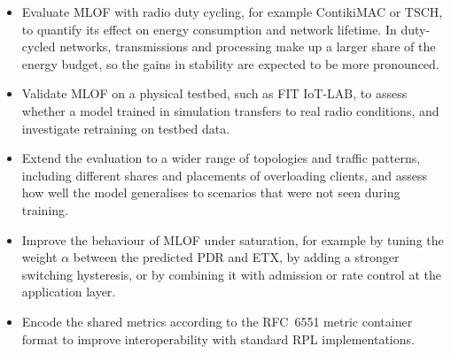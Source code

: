 \begin{itemize}
    \item Evaluate MLOF with radio duty cycling, for example
        ContikiMAC or TSCH, to quantify its effect on energy
        consumption and network lifetime. In duty-cycled networks,
        transmissions and processing make up a larger share of the
        energy budget, so the gains in stability are expected to be
        more pronounced.
    \item Validate MLOF on a physical testbed, such as FIT IoT-LAB, to
        assess whether a model trained in simulation transfers to
        real radio conditions, and investigate retraining on
        testbed data.
    \item Extend the evaluation to a wider range of topologies and
        traffic patterns, including different shares and placements of
        overloading clients, and assess how well the model
        generalises to scenarios that were not seen during training.
    \item Improve the behaviour of MLOF under saturation, for example
        by tuning the weight $\alpha$ between the predicted PDR and
        ETX, by adding a stronger switching hysteresis, or by
        combining
        it with admission or rate control at the application layer.
    \item Encode the shared metrics according to the RFC~6551 metric
        container format to improve interoperability with standard
        RPL implementations.
\end{itemize}
